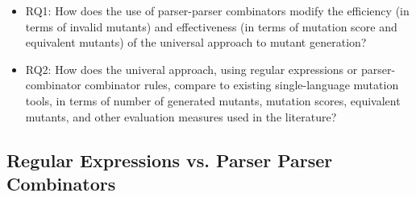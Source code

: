 \documentclass[sigconf,review, anonymous]{acmart}
\begin{document}
{\begin{itemize}

  \item{RQ1:}  How does the use of parser-parser combinators modify 
    the efficiency (in terms of invalid mutants) and effectiveness (in
    terms of mutation score and equivalent mutants) of the universal
    approach to mutant generation?

\item{RQ2:}  How does the univeral approach, using regular expressions
  or parser-combinator combinator rules, compare to existing
  single-language mutation tools, in terms of number of generated
  mutants, mutation scores, equivalent mutants, and other evaluation measures used in the literature?
    
  \end{itemize} 

\subsection{Regular Expressions vs. Parser Parser Combinators}

\begin{table}[hbtp]
\centering
\caption{C++ (Regex vs. Comby)}
\label{tab:table_cpp1}
\end{table}}
\end{document}
